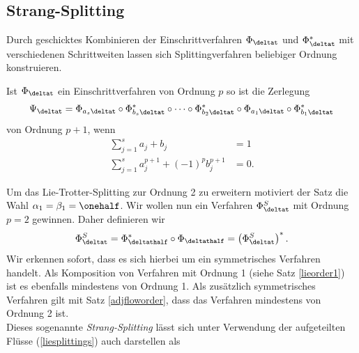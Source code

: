 \subsection{Strang-Splitting}
\label{secstrang}
Durch geschicktes Kombinieren der Einschrittverfahren $\Phi_{\deltat}$ und $\Phi_{\deltat}^*$ mit verschiedenen Schrittweiten lassen sich Splittingverfahren beliebiger Ordnung konstruieren.
\begin{maththeorem}
Ist $\Phi_{\deltat}$ ein Einschrittverfahren von Ordnung $p$ so ist die Zerlegung
\[\Psi_{\deltat}=\Phi_{a_s\deltat}\circ \Phi_{b_s\deltat}^*\circ\dots\circ\Phi_{b_2\deltat}^*\circ\Phi_{a_1\deltat}\circ\Phi_{b_1\deltat}^*\]
von Ordnung $p+1$, wenn 
\begin{align*}
\sum_{j=1}^sa_j+b_j&=1\\
\sum_{j=1}^sa_j^{p+1}+(-1)^pb_j^{p+1}&=0.
\end{align*}
\end{maththeorem}
Um das Lie-Trotter-Splitting zur Ordnung 2 zu erweitern motiviert der Satz die Wahl $\alpha_1=\beta_1=\onehalf$. Wir wollen nun ein Verfahren $\Phi_{\deltat}^S$ mit Ordnung $p=2$ gewinnen. Daher definieren wir
\[\Phi_{\deltat}^S=\Phi_{\deltathalf}^*\circ\Phi_{\deltathalf}=\left(\Phi_{\deltat}^S\right)^*.\]
Wir erkennen sofort, dass es sich hierbei um ein symmetrisches Verfahren handelt. Als Komposition von Verfahren mit Ordnung 1 (siehe Satz \ref{lieorder1}) ist es ebenfalls mindestens von Ordnung 1. Als zusätzlich symmetrisches Verfahren gilt mit Satz \ref{adjfloworder}, dass das Verfahren mindestens von Ordnung 2 ist.\\
Dieses sogenannte \emph{Strang-Splitting} lässt sich unter Verwendung der aufgeteilten Flüsse (\ref{liesplittings}) auch darstellen als 

